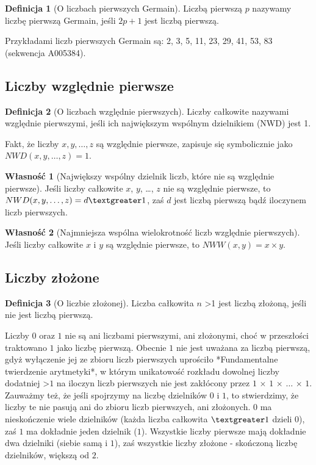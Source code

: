 \documentclass[10pt,onecolumn]{article}
\theoremstyle{definition}
\newtheorem{definition}{Definicja}
\theoremstyle{hypothesis}
\theoremstyle{capability}
\newtheorem{capability}{Własność}
\begin{document}
\begin{definition}[O liczbach pierwszych Germain]
Liczbą pierwszą $p$ nazywamy liczbę pierwszą Germain, jeśli $2p+1$ jest liczbą pierwszą.
\end{definition}

Przykładami liczb pierwszych Germain są: 2, 3, 5, 11, 23, 29, 41, 53, 83 (sekwencja A005384).

\subsection{Liczby względnie pierwsze}

\begin{definition}[O liczbach względnie pierwszych]
Liczby całkowite nazywami względnie pierwszymi, jeśli ich największym wspólnym dzielnikiem (NWD) jest 1.
\end{definition}

Fakt, że liczby $x, y, \dots , z$ są względnie pierwsze, zapisuje się symbolicznie jako $NWD (x, y,\dots ,z)=1$. 

\begin{capability}[Największy wspólny dzielnik liczb, które nie są względnie pierwsze]
Jeśli liczby całkowite $x$, $y$, \dots, $z$ nie są względnie pierwsze, to $NWD (x, y,\dots ,z) = d \textgreater 1$, zaś $d$ jest liczbą pierwszą bądź iloczynem liczb pierwszych.
\end{capability}

\begin{capability}[Najmniejsza wspólna wielokrotność liczb względnie pierwszych]
Jeśli liczby całkowite $x$ i $y$ są względnie pierwsze, to $NWW (x, y) = x \times y$.
\end{capability}

\subsection{Liczby złożone}

\begin{definition} [O liczbie złożonej]
Liczba całkowita $n$ \textgreater 1 jest liczbą złożoną, jeśli nie jest liczbą pierwszą.
\end{definition}

Liczby $0$ oraz $1$ nie są ani liczbami pierwszymi, ani złożonymi, choć w przeszłości traktowano $1$ jako liczbę pierwszą. Obecnie $1$ nie jest uważana za liczbą pierwszą, gdyż wyłączenie jej ze zbioru liczb pierwszych uprościło *Fundamentalne twierdzenie arytmetyki*, w którym unikatowość rozkładu dowolnej liczby dodatniej \textgreater $1$ na iloczyn liczb pierwszych nie jest zakłócony przez $1$ $\times$ $1$ $\times$ $\ldots$ $\times$ $1$. Zauważmy też, że jeśli spojrzymy na liczbę dzielników $0$ i $1$, to stwierdzimy, że liczby te nie pasują ani do zbioru liczb pierwszych, ani złożonych. $0$ ma nieskończenie wiele dzielników (każda liczba całkowita $\textgreater 1$ dzieli $0$), zaś $1$ ma dokładnie jeden dzielnik ($1$). Wszystkie liczby pierwsze mają dokładnie dwa dzielniki (siebie samą i $1$), zaś wszystkie liczby złożone - skończoną liczbę dzielników, większą od $2$.
\end{document}
